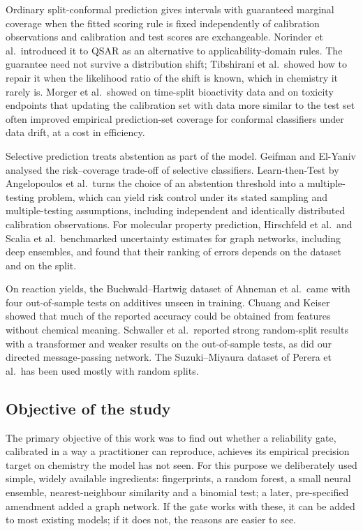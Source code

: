 \documentclass[11pt,letterpaper]{article}
\begin{document}
Ordinary split-conformal prediction gives intervals with guaranteed marginal coverage when the fitted scoring rule is fixed independently of calibration observations and calibration and test scores are exchangeable.\cite{vovk2005,lei2018} Norinder et al.\ introduced it to QSAR as an alternative to applicability-domain rules.\cite{norinder2014} The guarantee need not survive a distribution shift; Tibshirani et al.\ showed how to repair it when the likelihood ratio of the shift is known,\cite{tibshirani2019} which in chemistry it rarely is. Morger et al.\ showed on time-split bioactivity data and on toxicity endpoints that updating the calibration set with data more similar to the test set often improved empirical prediction-set coverage for conformal classifiers under data drift, at a cost in efficiency.\cite{morger2022}

Selective prediction treats abstention as part of the model. Geifman and El-Yaniv analysed the risk--coverage trade-off of selective classifiers.\cite{geifman2017} Learn-then-Test by Angelopoulos et al.\ turns the choice of an abstention threshold into a multiple-testing problem, which can yield risk control under its stated sampling and multiple-testing assumptions, including independent and identically distributed calibration observations.\cite{angelopoulos2021} For molecular property prediction, Hirschfeld et al.\ and Scalia et al.\ benchmarked uncertainty estimates for graph networks, including deep ensembles,\cite{lakshminarayanan2017} and found that their ranking of errors depends on the dataset and on the split.\cite{hirschfeld2020,scalia2020}

On reaction yields, the Buchwald--Hartwig dataset of Ahneman et al.\ came with four out-of-sample tests on additives unseen in training.\cite{ahneman2018} Chuang and Keiser showed that much of the reported accuracy could be obtained from features without chemical meaning.\cite{chuang2018} Schwaller et al.\ reported strong random-split results with a transformer and weaker results on the out-of-sample tests,\cite{schwaller2021} as did our directed message-passing network.\cite{yarish2023} The Suzuki--Miyaura dataset of Perera et al.\ has been used mostly with random splits.\cite{perera2018}

\subsection{Objective of the study}

The primary objective of this work was to find out whether a reliability gate, calibrated in a way a practitioner can reproduce, achieves its empirical precision target on chemistry the model has not seen. For this purpose we deliberately used simple, widely available ingredients: fingerprints, a random forest, a small neural ensemble, nearest-neighbour similarity and a binomial test; a later, pre-specified amendment added a graph network. If the gate works with these, it can be added to most existing models; if it does not, the reasons are easier to see.
\end{document}
